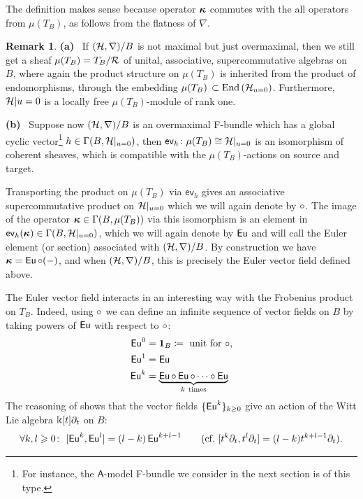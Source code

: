 \documentclass[twoside,leqno]{article}
\numberwithin{equation}{section}
\theoremstyle{plain}
\theoremstyle{definition}
\newtheorem{remark}[equation]{Remark}
\begin{document}
The definition makes sense because operator $\boldsymbol{\kappa}$ commutes with the all operators from $\mu(T_B)$, as follows from the flatness of $\nabla$.

\begin{remark} \label{rem-overmaxFqupEu} 
{\bfseries  (a)} \ If  $(\mathcal H,\nabla)/B$ is not maximal but just overmaximal, then we still get a sheaf $\mu(T_{B}) = T_{B}/\mathcal R$ of unital, associative, supercommutative algebras on $B$, where again the product structure on $\mu(T_{B})$ is inherited from the product of endomorphisms, through the embedding 
$\mu(T_{B}) \, \subset \operatorname{End}\left(\mathcal H_{u=0}\right)$. Furthermore,
$\mathcal H|{u=0}$ is a locally free $\mu(T_{B})$-module of rank one.

\smallskip

\noindent
{\bfseries (b)} \ Suppose now  $(\mathcal H,\nabla)/B$ is an overmaximal F-bundle which has a global cyclic vector\footnote{For instance,  the $\mathsf{A}$-model F-bundle we consider in the next section is of this type.} $h \in \Gamma(B,\mathcal H|_{u=0})$, then $\mathsf{ev}_{h}\colon \mu(T_{B}) \cong \mathcal H|_{u = 0}$  is an isomorphism of coherent sheaves,  which is compatible with the $\mu(T_{B})$-actions on source and target. 

\quad Transporting the product on $\mu(T_{B})$ via $\mathsf{ev}_{h}$ gives an associative supercommutative product on $\mathcal H|_{u=0}$ which we will again denote by $\circ$.
The image of the operator $\boldsymbol{\kappa} \in \Gamma(B,\mu(T_{B}))$ via this isomorphism is an element
in $\mathsf{ev}_{h}(\boldsymbol{\kappa})  \in \Gamma(B,\mathcal H|_{u=0})$, which we will  again denote by $\operatorname{\mathsf{Eu}}$ and will call the Euler element (or section) associated with
$(\mathcal H,\nabla)/B$. By construction we have $\boldsymbol{\kappa} = \operatorname{\mathsf{Eu}}\circ(-)$, and when
$(\mathcal H,\nabla)/B$, this is precisely the Euler vector field defined above.
\end{remark}

The Euler vector field interacts in an interesting way with the
Frobenius product on $T_{B}$. Indeed, using $\circ$ we can define an
infinite sequence of vector fields on $B$ by taking powers of $\operatorname{\mathsf{Eu}}$
with respect to $\circ$:
\[
\begin{aligned}
  \Eu^0 & = \mathbf{1}_{B} \coloneqq \text{ unit for } \fp, \\
  \Eu^1 & = \Eu \\
  \Eu^{k} & = \underbrace{\Eu\fp \Eu\fp \cdots \fp\Eu}_{k \ \text{times}}
\end{aligned}
\]
The reasoning of \cite[Proposition~3.6.2,Theorem~5.6]{Manin_Frobenius_manifolds}
shows that the vector fields $\{ \operatorname{\mathsf{Eu}}^{k} \}_{k\geq 0}$ give an action of the Witt
Lie algebra $\Bbbk[t]\partial_t$ 
on $B$:
\[
\forall k,l \geqslant 0 \colon \  [\operatorname{\mathsf{Eu}}^k, \operatorname{\mathsf{Eu}}^l]= (l-k)\operatorname{\mathsf{Eu}}^{k+l-1} \qquad
(\text{cf.\ }[t^k\partial_t,t^l\partial_t]=(l-k) t^{k+l-1}\partial_t ).
\]
\end{document}
